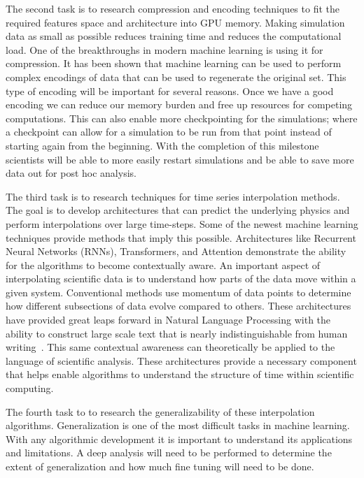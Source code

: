 \documentclass[12pt]{article}
\begin{document}
 The second task is to research compression and encoding techniques to
fit the required features space and architecture into GPU memory. Making
simulation data as small as possible reduces training time and reduces the
computational load. One of the breakthroughs in modern machine learning is using
it for compression. It has been shown that machine learning can be used to
perform complex encodings of data that can be used to regenerate the original
set. This type of encoding will be important for several reasons. Once we have a
good encoding we can reduce our memory burden and free up resources for
competing computations. This can also enable more checkpointing for the
simulations; where a checkpoint can allow for a simulation to be run from that
point instead of starting again from the beginning. With the completion of this
milestone scientists will be able to more easily restart simulations and be able
to save more data out for post hoc analysis.

 The third task is to research techniques for time series interpolation
methods. The goal is to develop architectures that can predict 
the underlying physics and perform interpolations over large time-steps. Some
of the newest machine learning techniques provide methods that imply this
possible. Architectures like Recurrent Neural Networks (RNNs), Transformers, and
Attention demonstrate the ability for the algorithms to become contextually
aware. An important aspect of interpolating scientific data is to understand how
parts of the data move within a given system. Conventional methods use momentum
of data points to determine how different subsections of data evolve compared to
others. These architectures have provided great leaps forward in Natural
Language Processing with the ability to construct large scale text that is
nearly indistinguishable from human writing~\cite{radford2019language}. This
same contextual awareness can theoretically be applied to the language of
scientific analysis. These architectures provide a necessary component that
helps enable algorithms to understand the structure of time within scientific
computing. 

 The fourth task to to research the generalizability of these
interpolation algorithms. Generalization is one of the most difficult tasks in
machine learning. With any algorithmic development it is important to understand
its applications and limitations. A deep analysis will need to be performed to
determine the extent of generalization and how much fine tuning will need to be
done. 
\end{document}
